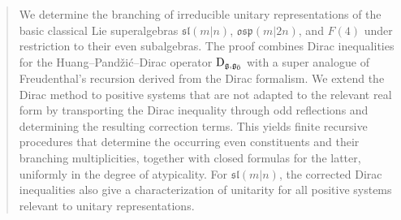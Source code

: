 \documentclass[11pt]{amsart}
\begin{document}
\thispagestyle{empty}


\begin{abstract}
We determine the branching of irreducible unitary representations of the basic classical Lie superalgebras $\mathfrak{sl}(m|n)$, $\mathfrak{osp}(m|2n)$, and $F(4)$ under restriction to their even subalgebras. The proof combines Dirac inequalities for the Huang--Pand\v{z}i\'{c}--Dirac operator $\Dirac_{\gg,\even}$ with a super analogue of Freudenthal's recursion derived from the Dirac formalism. We extend the Dirac method to positive systems that are not adapted to the relevant real form by transporting the Dirac inequality through odd reflections and determining the resulting correction terms. This yields finite recursive procedures that determine the occurring even constituents and their branching multiplicities, together with closed formulas for the latter, uniformly in the degree of atypicality. For $\mathfrak{sl}(m|n)$, the corrected Dirac inequalities also give a characterization of unitarity for all positive systems relevant to unitary representations.
\end{abstract}


\maketitle

\setlength{\parindent}{1em}
\setcounter{tocdepth}{2}


\tableofcontents





\end{document}
